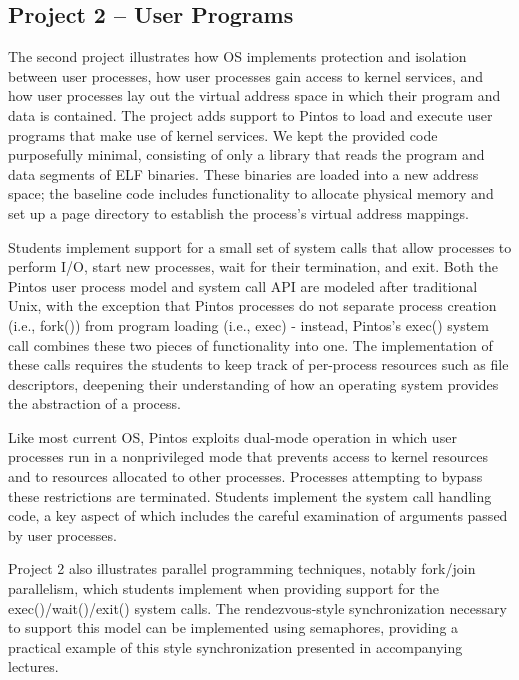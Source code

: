 %
%
%
\subsection{Project 2 -- User Programs}
The second project illustrates how OS implements protection and isolation between user processes,
how user processes gain access to kernel services, and how user processes lay out the virtual
address space in which their program and data is contained.
The project adds support to Pintos to load and execute user programs that make use
of kernel services.  We kept the provided code purposefully minimal, consisting of
only a library that reads the program and data segments of ELF binaries.   These binaries
are loaded into a new address space; the baseline code includes functionality to allocate
physical memory and set up a page directory to establish the process's virtual address
mappings.

Students implement support for a small set of system calls that allow processes to perform
I/O, start new processes, wait for their termination, and exit.  Both the Pintos user 
process model and system call API are modeled after traditional Unix, with the exception 
that Pintos processes do not separate process creation (i.e., fork()) from program loading
(i.e., exec) - instead, Pintos's exec() system call combines these two pieces of functionality 
into one.  The implementation of these calls requires the students to keep track of
per-process resources such as file descriptors, deepening their understanding of how
an operating system provides the abstraction of a process.

Like most current OS, Pintos exploits dual-mode operation in which user processes run
in a nonprivileged mode that prevents access to kernel resources and to resources allocated
to other processes.  Processes attempting to bypass these restrictions are terminated.
Students implement the system call handling code, a key aspect of which includes the
careful examination of arguments passed by user processes.

Project 2 also illustrates parallel programming techniques, notably fork/join
parallelism, which students implement when providing support for the exec()/wait()/exit() 
system calls.  The rendezvous-style synchronization necessary to support this model
can be implemented using semaphores, providing a practical example of this style
synchronization presented in accompanying lectures.


